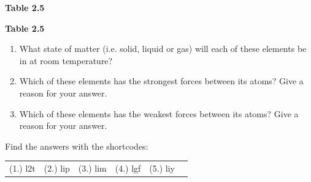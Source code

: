 \begin{enumerate}[noitemsep, label=\textbf{\arabic*}. ]
\begin{table}[H]
\begin{center}
\begin{xtabular}[t]{|l|l|l|}
    \end{xtabular}
      \end{center}
    \begin{center}{\small\bfseries Table 2.5}\end{center}
    \begin{caption}{\small\bfseries Table 2.5}\end{caption}
\end{table}
    \par
  \label{m38730*id312057}\begin{enumerate}[noitemsep, label=\textbf{\alph*}. ] 
            \label{m38730*uid109}\item What state of matter (i.e. solid, liquid or gas) will each of 
these elements be in at room temperature?
\label{m38730*uid110}\item Which of these elements has the strongest forces 
between its atoms? Give a reason for your answer.
\label{m38730*uid111}\item Which of these elements has the weakest forces between 
its atoms? Give a reason for your answer.
\end{enumerate}
                \end{enumerate}
\label{m38730**end}
  \label{3fc6acf7f608d0b0e2d136d6a7710402**end}
\par {} Find the answers with the shortcodes:
 \par \begin{tabular}[h]{cccccc}
 (1.) l2t  &  (2.) lip  &  (3.) lim  &  (4.) lgf  &  (5.) liy  & \end{tabular}
